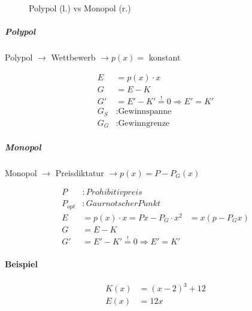 \begin{figure}[H]
    \caption{Polypol (l.) vs Monopol (r.)}
\end{figure}

\subparagraph{Polypol}

Polypol \( \rightarrow \) Wettbewerb \( \rightarrow p(x) = \) konstant

\begin{align*}
    E &= p(x) \cdot x \\
    G &= E - K \\
    G' &= E' - K' \overset{!}{=} 0 \Rightarrow E' = K' \\
    G_S &: \text{Gewinnspanne} \\
    G_G &: \text{Gewinngrenze}
\end{align*}

\subparagraph{Monopol}

Monopol \( \rightarrow \) Preisdiktatur \( \rightarrow p(x) = P - P_G(x) \)

\begin{align*}
    P &: Prohibitivpreis \\
    P_{opt} &: Gaurnotscher Punkt \\
    E &= p(x) \cdot x = Px - P_G \cdot x^2 &= x(p - P_G x) \\
    G &= E - K \\
    G' &= E' - K' \overset{!}{=} 0 \Rightarrow E' = K'
\end{align*}

\paragraph{Beispiel}

\begin{align*}
    K(x) &= (x - 2)^3 + 12 \\
    E(x) &= 12x
\end{align*}

